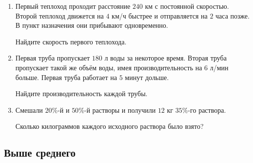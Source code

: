 \documentclass[a4paper,12pt]{article}
\begin{document}
\begin{enumerate}[label=\textbf{\arabic*.}]

\item
Первый теплоход проходит расстояние \(240\) км с постоянной скоростью. Второй теплоход движется на \(4\) км/ч быстрее и отправляется на \(2\) часа позже. В пункт назначения они прибывают одновременно.

Найдите скорость первого теплохода.

\item
Первая труба пропускает \(180\) л воды за некоторое время. Вторая труба пропускает такой же объём воды, имея производительность на \(6\) л/мин больше. Первая труба работает на \(5\) минут дольше.

Найдите производительность каждой трубы.

\item
Смешали \(20\%\)-й и \(50\%\)-й растворы и получили \(12\) кг \(35\%\)-го раствора.

Сколько килограммов каждого исходного раствора было взято?

\end{enumerate}

\subsection*{\color{darkaccent}Выше среднего}
\end{document}
